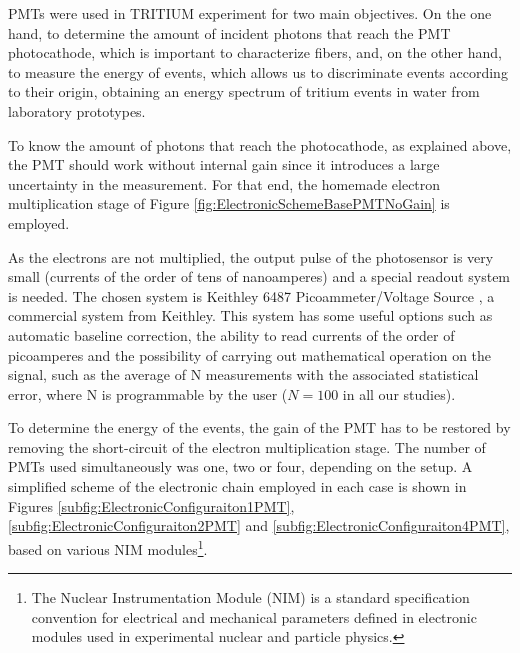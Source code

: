 PMTs were used in TRITIUM experiment for two main objectives. On the one hand, to determine the amount of incident photons that reach the PMT photocathode, which is important to characterize fibers, and, on the other hand, to measure the energy of events, which allows us to discriminate events according to their origin, obtaining an energy spectrum of tritium events in water from laboratory prototypes.

To know the amount of photons that reach the photocathode, as explained above, the PMT should work without internal gain since it introduces a large uncertainty in the measurement. For that end, the homemade electron multiplication stage of Figure \ref{fig:ElectronicSchemeBasePMTNoGain} is employed. 

As the electrons are not multiplied, the output pulse of the photosensor is very small (currents of the order of tens of nanoamperes) and a special readout system is needed. The chosen system is Keithley 6487 Picoammeter/Voltage Source \cite{DataSheetKeithley6487}, a commercial system from Keithley. This system has some useful options such as automatic baseline correction, the ability to read currents of the order of picoamperes and the possibility of carrying out mathematical operation on the signal, such as the average of N measurements with the associated statistical error, where N is programmable by the user ($N=100$ in all our studies). 

To determine the energy of the events, the gain of the PMT has to be restored by removing the short-circuit of the electron multiplication stage. The number of PMTs used simultaneously was one, two or four, depending on the setup. A simplified scheme of the electronic chain employed in each case is shown in Figures \ref{subfig:ElectronicConfiguraiton1PMT}, \ref{subfig:ElectronicConfiguraiton2PMT} and \ref{subfig:ElectronicConfiguraiton4PMT}, based on various NIM modules\footnote{The Nuclear Instrumentation Module (NIM) is a standard specification convention for electrical and mechanical parameters defined in electronic modules used in experimental nuclear and particle physics.}.

